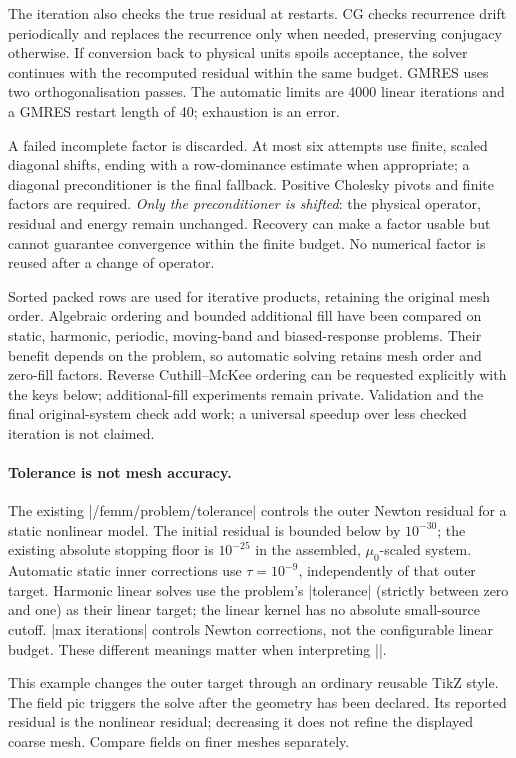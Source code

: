 The iteration also checks the true residual at restarts. CG checks recurrence
drift periodically and replaces the recurrence only when needed, preserving
conjugacy otherwise. If conversion back to physical units spoils acceptance,
the solver continues with the recomputed residual within the same budget.
GMRES uses two orthogonalisation passes. The automatic limits are 4000 linear
iterations and a GMRES restart length of 40; exhaustion is an error.

A failed incomplete factor is discarded. At most six attempts use finite,
scaled diagonal shifts, ending with a row-dominance estimate when appropriate;
a diagonal preconditioner is the final fallback. Positive Cholesky pivots and
finite factors are required. \emph{Only the preconditioner is shifted}: the
physical operator, residual and energy remain unchanged. Recovery can make a
factor usable but cannot guarantee convergence within the finite budget.
No numerical factor is reused after a change of operator.

Sorted packed rows are used for iterative products, retaining the original
mesh order. Algebraic ordering and bounded additional fill have been compared
on static, harmonic, periodic, moving-band and biased-response problems.
Their benefit depends on the problem, so automatic solving retains mesh order
and zero-fill factors. Reverse Cuthill--McKee ordering can be requested explicitly with the keys below;
additional-fill experiments remain private.
Validation and the final original-system check add work; a universal speedup
over less checked iteration is not claimed.

\paragraph{Tolerance is not mesh accuracy.}
The existing |/femm/problem/tolerance| controls the outer Newton residual for a
static nonlinear model. The initial residual is bounded below by $10^{-30}$;
the existing absolute stopping floor is $10^{-25}$ in the assembled,
$\mu_0$-scaled system. Automatic static inner corrections use $\tau=10^{-9}$,
independently of that outer target. Harmonic linear solves use the problem's
|tolerance| (strictly between zero and one) as their linear target; the linear kernel has no absolute
small-source cutoff. |max iterations| controls Newton corrections, not the
configurable linear budget. These different meanings matter when interpreting
||.

This example changes the outer target through an ordinary reusable TikZ style.
The field pic triggers the solve after the geometry has been declared. Its
reported residual is the nonlinear residual; decreasing it does not refine
the displayed coarse mesh. Compare fields on finer meshes separately.

